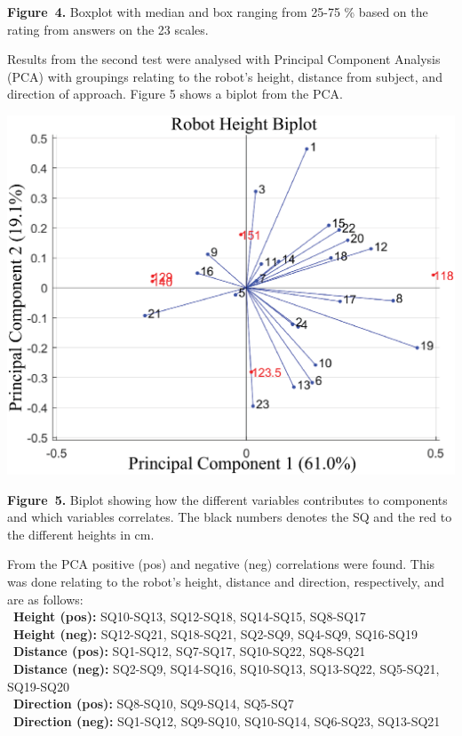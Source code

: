 \documentclass[paperwidth=118cm,paperheight=84cm,landscape,fontscale=0.2941]{baposter}
\begin{document}
\begin{poster}
{\begin{center}
\textbf{Figure~4. }\footnotesize{Boxplot with median and box ranging from 25-75 \% based on the rating from answers on the 23 scales.}
\end{center}
\vspace{-10pt}
Results from the second test were analysed with Principal Component Analysis (PCA) with groupings relating to the robot's height, distance from subject, and direction of approach. Figure 5 shows a biplot from the PCA.
\begin{center}
\vspace{-10pt}
	\includegraphics[width=0.9\linewidth]{RHeight-Biplot.eps}
	
	\vspace{-10pt}

\textbf{Figure~5. }\footnotesize{Biplot showing how the different variables contributes to components and which variables correlates. The black numbers denotes the SQ and the red to the different heights in cm.}
\end{center}
From the PCA positive (pos) and negative (neg) correlations were found. This was done relating to the robot's height, distance and direction, respectively, and are as follows:\\
\textbullet~\textbf{Height (pos):}  SQ10-SQ13, SQ12-SQ18, SQ14-SQ15, SQ8-SQ17\\
\textbullet~\textbf{Height (neg):} SQ12-SQ21, SQ18-SQ21, SQ2-SQ9, SQ4-SQ9, SQ16-SQ19\\
\textbullet~\textbf{Distance (pos):} SQ1-SQ12, SQ7-SQ17, SQ10-SQ22, SQ8-SQ21\\
\textbullet~\textbf{Distance (neg):} SQ2-SQ9, SQ14-SQ16, SQ10-SQ13, SQ13-SQ22, SQ5-SQ21, SQ19-SQ20\\
\textbullet~\textbf{Direction (pos):} SQ8-SQ10, SQ9-SQ14, SQ5-SQ7\\
\textbullet~\textbf{Direction (neg):} SQ1-SQ12, SQ9-SQ10, SQ10-SQ14, SQ6-SQ23, SQ13-SQ21

}
\end{poster}
\end{document}
